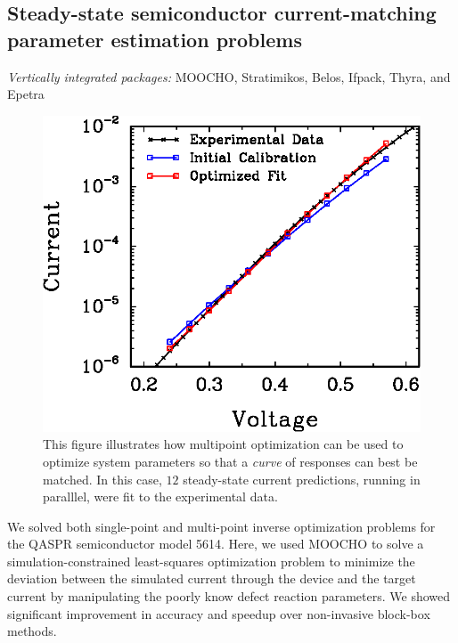 \documentclass[pdf,ps2pdf,11pt]{SANDreport}
\begin{document}
%
\subsection{Steady-state semiconductor current-matching parameter
estimation problems}
%

{}\noindent\textit{Vertically integrated packages:} MOOCHO, Stratimikos,
Belos, Ifpack, Thyra, and Epetra

{\bsinglespace
\begin{figure}
\begin{center}
\includegraphics*[angle=0,scale=0.80,width=0.50\linewidth
]{multiPointFit}
\end{center}
\caption[Multipoint current-matching parameter estimation solution against experimental data]{
\label{fig:multiPointFit}
This figure illustrates how multipoint optimization can be used to optimize
system parameters so that a {\em curve} of responses can best be matched. In
this case, $12$ steady-state current predictions, running in paralllel, were
fit to the experimental data.}
\end{figure}
\esinglespace}

We solved both single-point and multi-point inverse optimization problems for
the QASPR semiconductor model 5614.  Here, we used MOOCHO to solve a
simulation-constrained least-squares optimization problem to minimize the
deviation between the simulated current through the device and the target
current by manipulating the poorly know defect reaction parameters.  We showed
significant improvement in accuracy and speedup over non-invasive block-box
methods.


\end{document}
